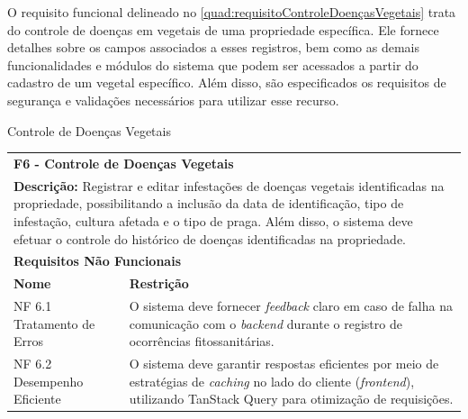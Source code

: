 \clearpage

O requisito funcional delineado no \autoref{quad:requisitoControleDoençasVegetais} trata do controle de doenças em vegetais de uma propriedade específica. Ele fornece detalhes sobre os campos associados a esses registros, bem como as demais funcionalidades e módulos do sistema que podem ser acessados a partir do cadastro de um vegetal específico. Além disso, são especificados os requisitos de segurança e validações necessários para utilizar esse recurso.

\begin{tabframed}[htb]
  \caption{Controle de Doenças Vegetais}
  \label{quad:requisitoControleDoençasVegetais}
  \renewcommand{\arraystretch}{1.5}
  \begin{tabular}{|l|l|}
    \cline{1-2}
    \multicolumn{2}{|l|}{\textbf{F6 - Controle de Doenças Vegetais}}
    \\ \cline{1-2}

    \multicolumn{2}{|p{15cm}|}{
    \raggedright \textbf{Descrição:} Registrar e editar infestações de doenças vegetais identificadas na propriedade, possibilitando a inclusão da data de identificação, tipo de infestação, cultura afetada e o tipo de praga. Além disso, o sistema deve efetuar o controle do histórico de doenças identificadas na propriedade.
    }
    \\ \cline{1-2}

    \multicolumn{2}{|l|}{\textbf{Requisitos Não Funcionais}}
    \\ \cline{1-2}

    \textbf{Nome}               &
    \textbf{Restrição}
    \\ \cline{1-2}

    NF 6.1 Tratamento de Erros  &
    \multicolumn{1}{|p{8cm}|}{\raggedright O sistema deve fornecer \textit{feedback} claro em caso de falha na comunicação com o \textit{backend} durante o registro de ocorrências fitossanitárias.}
    \\ \cline{1-2}

    NF 6.2 Desempenho Eficiente &
    \multicolumn{1}{|p{8cm}|}{\raggedright O sistema deve garantir respostas eficientes por meio de estratégias de \textit{caching} no lado do cliente (\textit{frontend}), utilizando TanStack Query para otimização de requisições.}
    \\ \cline{1-2}
  \end{tabular}
  \fonte{} %
\end{tabframed}

\clearpage

